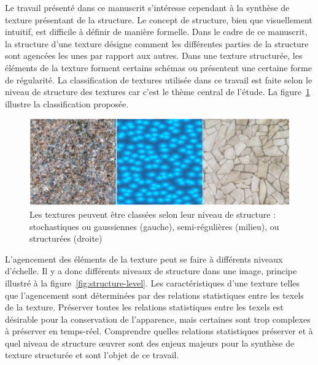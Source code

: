 Le travail présenté dans ce manuscrit s'intéresse cependant à la synthèse de texture présentant de la structure. Le concept de structure, bien que visuellement intuitif, est difficile à définir de manière formelle. Dans le cadre de ce manuscrit, la structure d'une texture désigne comment les différentes parties de la structure sont agencées les unes par rapport aux autres. Dans une texture structurée, les éléments de la texture forment certains schémas ou présentent une certaine forme de régularité. La classification de textures utilisée dans ce travail est faite selon le niveau de structure des textures car c'est le thème central de l'étude. La figure~\ref{fig:échelle-structure} illustre la classification proposée.

\bigskip

\begin{figure}
    \centering
    \includegraphics[width=\textwidth]{contenu/resources/images/structure_scale_loucas}
    \caption[Classification des textures selon leur niveau de structure]{Les textures peuvent être classées selon leur niveau de structure : stochastiques ou gaussiennes (gauche), semi-régulières (milieu), ou structurées (droite)}
    \label{fig:échelle-structure}
\end{figure}

L'agencement des éléments de la texture peut se faire à différents niveaux d'échelle. Il y a donc différents niveaux de structure dans une image, principe illustré à la figure~\ref{fig:structure-level}. Les caractéristiques d'une texture telles que l'agencement sont déterminées par des relations statistiques entre les texels de la texture. Préserver toutes les relations statistiques entre les texels est désirable pour la conservation de l'apparence, mais certaines sont trop complexes à préserver en temps-réel. Comprendre quelles relations statistiques préserver et à quel niveau de structure œuvrer sont des enjeux majeurs pour la synthèse de texture structurée et sont l'objet de ce travail.

